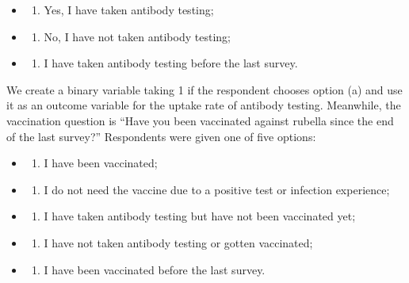 \documentclass[
]{article}
\providecommand{\tightlist}{%
  \setlength{\itemsep}{0pt}\setlength{\parskip}{0pt}}
\begin{document}
\begin{itemize}
\item
  \begin{enumerate}
  \def\labelenumi{(\alph{enumi})}
  \tightlist
  \item
    Yes, I have taken antibody testing;
  \end{enumerate}
\item
  \begin{enumerate}
  \def\labelenumi{(\alph{enumi})}
  \setcounter{enumi}{1}
  \tightlist
  \item
    No, I have not taken antibody testing;
  \end{enumerate}
\item
  \begin{enumerate}
  \def\labelenumi{(\alph{enumi})}
  \setcounter{enumi}{2}
  \tightlist
  \item
    I have taken antibody testing before the last survey.
  \end{enumerate}
\end{itemize}

We create a binary variable taking 1 if the respondent chooses option (a) and use it as an outcome variable for the uptake rate of antibody testing. Meanwhile, the vaccination question is ``Have you been vaccinated against rubella since the end of the last survey?'' Respondents were given one of five options:

\begin{itemize}
\item
  \begin{enumerate}
  \def\labelenumi{(\alph{enumi})}
  \tightlist
  \item
    I have been vaccinated;
  \end{enumerate}
\item
  \begin{enumerate}
  \def\labelenumi{(\alph{enumi})}
  \setcounter{enumi}{1}
  \tightlist
  \item
    I do not need the vaccine due to a positive test or infection experience;
  \end{enumerate}
\item
  \begin{enumerate}
  \def\labelenumi{(\alph{enumi})}
  \setcounter{enumi}{2}
  \tightlist
  \item
    I have taken antibody testing but have not been vaccinated yet;
  \end{enumerate}
\item
  \begin{enumerate}
  \def\labelenumi{(\alph{enumi})}
  \setcounter{enumi}{3}
  \tightlist
  \item
    I have not taken antibody testing or gotten vaccinated;
  \end{enumerate}
\item
  \begin{enumerate}
  \def\labelenumi{(\alph{enumi})}
  \setcounter{enumi}{4}
  \tightlist
  \item
    I have been vaccinated before the last survey.
  \end{enumerate}
\end{itemize}
\end{document}
